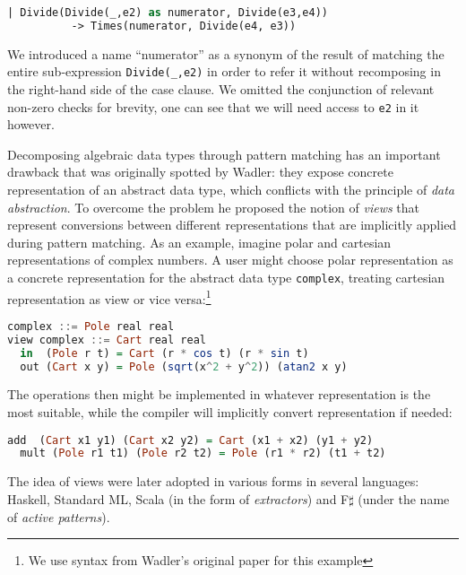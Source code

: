 \documentclass[preprint]{sigplanconf}
\DeclareRobustCommand{\codeocaml}[1]{{\lstinline[breaklines=false,language=Caml]{#1}}}
\begin{document}
\begin{lstlisting}[language=Caml,keepspaces,columns=flexible]
    | Divide(Divide(_,e2) as numerator, Divide(e3,e4))
          -> Times(numerator, Divide(e4, e3))
\end{lstlisting}

We introduced a name ``numerator'' as a synonym of the result of matching the 
entire sub-expression \codeocaml{Divide(_,e2)} in order to refer it without 
recomposing in the right-hand side of the case clause. We omitted the 
conjunction of relevant non-zero checks for brevity, one can see that we will 
need access to \codeocaml{e2} in it however.

Decomposing algebraic data types through pattern matching has an important 
drawback that was originally spotted by Wadler\cite{Wadler87}: they expose 
concrete representation of an abstract data type, which conflicts with the 
principle of \emph{data abstraction}. To overcome the problem he proposed the 
notion of \emph{views} that represent conversions between different 
representations that are implicitly applied during pattern matching. As an 
example, imagine polar and cartesian representations of complex numbers. A user 
might choose polar representation as a concrete representation for the abstract 
data type \codeocaml{complex}, treating cartesian representation as view or vice 
versa:\footnote{We use syntax from Wadler's original paper for this example}

\begin{lstlisting}[language=Haskell,columns=flexible]
complex ::= Pole real real
view complex ::= Cart real real
  in  (Pole r t) = Cart (r * cos t) (r * sin t)
  out (Cart x y) = Pole (sqrt(x^2 + y^2)) (atan2 x y)
\end{lstlisting}

The operations then might be implemented in whatever representation is the most 
suitable, while the compiler will implicitly convert representation if needed:

\begin{lstlisting}[language=Haskell,columns=flexible]
  add  (Cart x1 y1) (Cart x2 y2) = Cart (x1 + x2) (y1 + y2)
  mult (Pole r1 t1) (Pole r2 t2) = Pole (r1 * r2) (t1 + t2)
\end{lstlisting}

The idea of views were later adopted in various forms in several languages: 
Haskell\cite{views96}, Standard ML\cite{views98}, Scala (in the form of 
\emph{extractors}\cite{EmirThesis}) and F$\sharp$ (under the name of 
\emph{active patterns}\cite{Syme07}).
\end{document}
